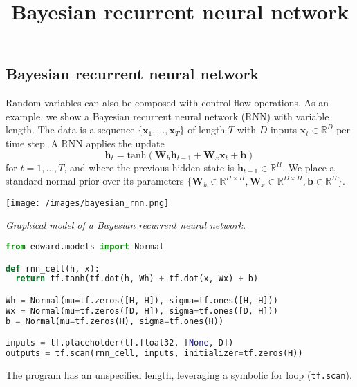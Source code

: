 \title{Bayesian recurrent neural network}

\subsection{Bayesian recurrent neural network}

Random variables can also be composed with control flow operations.
As an example, we show a Bayesian recurrent
neural network (RNN) with
variable length.
The data is a sequence $\{\mathbf{x}_1,\ldots,\mathbf{x}_T\}$ of length $T$ with $D$
inputs $\mathbf{x}_t\in\mathbb{R}^{D}$ per time step.
A RNN applies the update
\begin{equation*}
\mathbf{h}_t = \text{tanh}(\mathbf{W}_h \mathbf{h}_{t-1} +
\mathbf{W}_x \mathbf{x}_t + \mathbf{b})
\end{equation*}
for $t=1,\ldots,T$, and where the previous hidden state is
$\mathbf{h}_{t-1}\in\mathbb{R}^H$.
We place a standard normal prior over its parameters
$\{\mathbf{W}_h\in\mathbb{R}^{H\times H}, \mathbf{W}_x\in\mathbb{R}^{D\times H},
\mathbf{b}\in\mathbb{R}^H\}$.

\texttt{[image: /images/bayesian\_rnn.png]}

{\small\textit{Graphical model of a Bayesian recurrent neural network.}}

\begin{lstlisting}[language=python]
from edward.models import Normal

def rnn_cell(h, x):
  return tf.tanh(tf.dot(h, Wh) + tf.dot(x, Wx) + b)

Wh = Normal(mu=tf.zeros([H, H]), sigma=tf.ones([H, H]))
Wx = Normal(mu=tf.zeros([D, H]), sigma=tf.ones([D, H]))
b = Normal(mu=tf.zeros(H), sigma=tf.ones(H))

inputs = tf.placeholder(tf.float32, [None, D])
outputs = tf.scan(rnn_cell, inputs, initializer=tf.zeros(H))
\end{lstlisting}

The program has an unspecified length, leveraging a symbolic for loop
(\texttt{tf.scan}).
